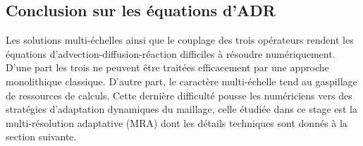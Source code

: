 \subsection{Conclusion sur les équations d'ADR}
Les solutions multi-échelles ainsi que le couplage des trois opérateurs
rendent les équations d'advection-diffusion-réaction difficiles à résoudre numériquement.
D'une part les trois ne peuvent être traitées efficacement par une approche monolithique classique. 
D'autre part, le caractère multi-échelle tend au gaspillage de ressources de calculs.
Cette dernière difficulté pousse les numériciens vers des stratégies d'adaptation dynamiques du maillage, 
celle étudiée dans ce stage est la multi-résolution adaptative (MRA) dont les détails techniques sont donnés à la section suivante.